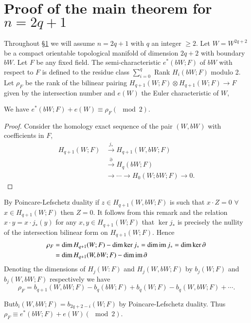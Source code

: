 \section{Proof of the main theorem for $n = 2q +1$}\label{chap1:sec6}

Throughout \S \ref{chap1:sec6} we will assume $n = 2q +1$ with $q$ an integer $\geq
2$. Let $W = W^{2q +2}$ be a compact orientable topological
manifold\pageoriginale 
of dimension $2q+2$ with boundary $bW$. Let $F$ be any fixed
field. The semi-characteristic $e^* (bW; F)$ of $bW$ with respect to
$F$ is defined to the residue class $\sum\limits^{q}_{i = 0}$ Rank
$H_i (bW; F)$ modulo 2. Let $\rho_F$ be the rank of the bilinear
pairing $H_{q+1}(W; F) \otimes H_{q+1} (W; F) \to F$ given by the
intersection number and $e (W)$ the Euler characteristic of $W$,  

\begin{lemma}\label{chap1:lem6.1}%
 We have $e^* (bW; F) + e (W) \equiv \rho_F (\mod 2)$. 
\end{lemma}

\begin{proof}
Consider the homology exact sequence of the pair $(W, bW)$ with
coefficients in $F$,  
\begin{align*}
H_{q + 1}(W; F) &\xrightarrow{j_*} H_{q+1} (W, bW; F)\\
&\xrightarrow{\partial} H_q (bW; F)\\ 
&\to \cdots \to H_0 (W; bW; F) \to 0. 
\end{align*}
\end{proof} 

By Poincare-Lefschetz duality if $z \in H_{q+1} (W, bW; F)$ is
such that $x\cdot Z = 0$ $\forall$ $x \in H_{q+1} (W; F)$ then $Z =
0$. It follows from this remark and the relation $x \cdot y =
x \cdot j_*(y)$ for any $x, y \in H_{q+1} (W; F)$ that $\ker j_*$
is precisely the nullity of the intersection bilinear form on $H_{q+1}
(W; F)$. Hence  
\begin{align*}
\rho_F& = \dim H_{q+1} (W; F) - \dim \ker j_* = \dim \operatorname{im} j_* = \dim
\ker \partial\\ 
&= \dim H_{q+1} (W, bW; F)- \dim \operatorname{im} \partial 
\end{align*}
Denoting the dimensions of $H_j (W: F)$ and $H_j (W, bW; F)$ by $b_j
(W; F)$ and $b_j (W, bW; F)$ respectively we have  
$$
\rho_F = b_{q+1} (W, bW ; F) - b_q (bW ; F) + b_q (W; F)- b_q (W, bW;
F)+ \cdots. 
$$ 

But\pageoriginale $b_i (W, bW; F) = b_{2q +2-i} (W; F)$ by
Poincare-Lefschetz duality. Thus $\rho_F \equiv e^* (bW; F) + e (W)
(\mod 2)$.  

